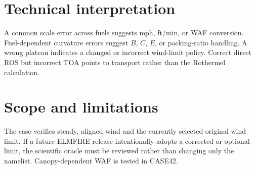 \section{Technical interpretation}
A common scale error across fuels suggests mph, ft/min, or WAF conversion.  Fuel-dependent curvature errors suggest $B$, $C$, $E$, or packing-ratio handling.  A wrong plateau indicates a changed or incorrect wind-limit policy.  Correct direct ROS but incorrect TOA points to transport rather than the Rothermel calculation.

\section{Scope and limitations}
The case verifies steady, aligned wind and the currently selected original wind limit.  If a future ELMFIRE release intentionally adopts a corrected or optional limit, the scientific oracle must be reviewed rather than changing only the namelist.  Canopy-dependent WAF is tested in CASE42.
